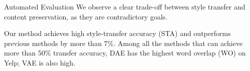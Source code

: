 \documentclass[final]{beamer}
\newlength{\onecolwid}
\newlength{\twocolwid}
\begin{document}
\begin{frame}[t]
\begin{columns}[t]
\begin{column}{\twocolwid}
\begin{columns}[t,totalwidth=\twocolwid]
\begin{column}{\onecolwid}

                \end{column} %

            \end{columns} %






            \begin{columns}[t,totalwidth=\twocolwid] %

                \begin{column}{\onecolwid} %

                    \begin{block}{Automated Evaluation}
                        We observe a clear trade-off between style transfer and content preservation, as they are contradictory goals.

                        Our method achieves high style-transfer accuracy (STA) and outperforms previous methods by more than 7\%. Among all the methods that can achieve more than 50\% transfer accuracy, DAE has the highest word overlap (WO) on Yelp; VAE is also high.


\end{block}
\end{column}
\end{columns}
\end{column}
\end{columns}
\end{frame}
\end{document}
